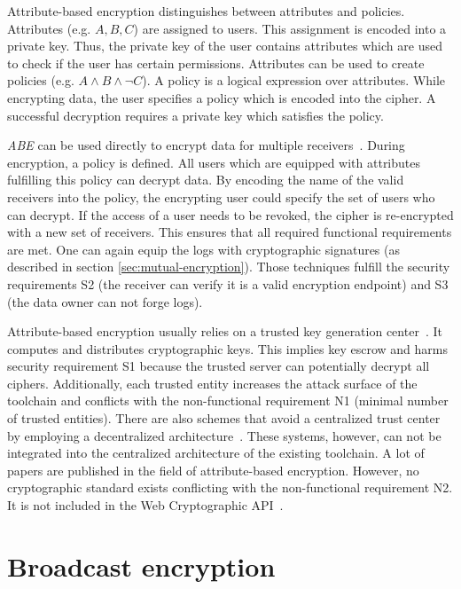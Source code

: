 \documentclass[../main.tex]{subfiles}
\begin{document}
Attribute-based encryption distinguishes between attributes and policies.
Attributes (e.g. ${A,B,C}$) are assigned to users.
This assignment is encoded into a private key.
Thus, the private key of the user contains attributes which are used to check if the user has certain permissions.
Attributes can be used to create policies (e.g. $A \land B \land \neg C$).
A policy is a logical expression over attributes.
While encrypting data, the user specifies a policy which is encoded into the cipher.
A successful decryption requires a private key which satisfies the policy.

\emph{ABE} can be used directly to encrypt data for multiple receivers~\cite{Bethencourt2007}. 
During encryption, a policy is defined. 
All users which are equipped with attributes fulfilling this policy can decrypt data.
By encoding the name of the valid receivers into the policy, the encrypting user could specify the set of users who can decrypt.
If the access of a user needs to be revoked, the cipher is re-encrypted with a new set of receivers.
This ensures that all required functional requirements are met.
One can again equip the logs with cryptographic signatures (as described in section \ref{sec:mutual-encryption}).
Those techniques fulfill the security requirements S2 (the receiver can verify it is a valid encryption endpoint) and S3 (the data owner can not forge logs).

Attribute-based encryption usually relies on a trusted key generation center~\cite{Sahai2009}.
It computes and distributes cryptographic keys.
This implies key escrow and harms security requirement S1 because the trusted server can potentially decrypt all ciphers.
Additionally, each trusted entity increases the attack surface of the toolchain and conflicts with the non-functional requirement N1 (minimal number of trusted entities).
There are also schemes that avoid a centralized trust center by employing a decentralized architecture~\cite{Vaanchig2018}.
These systems, however, can not be integrated into the centralized architecture of the existing toolchain.
A lot of papers are published in the field of attribute-based encryption.
However, no cryptographic standard exists conflicting with the non-functional requirement N2.
It is not included in the Web Cryptographic API~\cite{WebCryptoApi2017}.

\section{Broadcast encryption}
\label{sec:broadcast-encryption}
\end{document}
